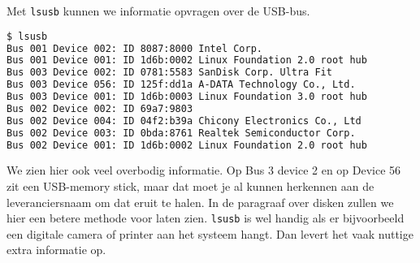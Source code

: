 Met \texttt{lsusb} kunnen we informatie opvragen over de USB-bus.

\begin{lstlisting}[language=bash]
$ lsusb
Bus 001 Device 002: ID 8087:8000 Intel Corp. 
Bus 001 Device 001: ID 1d6b:0002 Linux Foundation 2.0 root hub
Bus 003 Device 002: ID 0781:5583 SanDisk Corp. Ultra Fit
Bus 003 Device 056: ID 125f:dd1a A-DATA Technology Co., Ltd. 
Bus 003 Device 001: ID 1d6b:0003 Linux Foundation 3.0 root hub
Bus 002 Device 002: ID 69a7:9803  
Bus 002 Device 004: ID 04f2:b39a Chicony Electronics Co., Ltd 
Bus 002 Device 003: ID 0bda:8761 Realtek Semiconductor Corp. 
Bus 002 Device 001: ID 1d6b:0002 Linux Foundation 2.0 root hub
\end{lstlisting}
We zien hier ook veel overbodig informatie. Op Bus 3 device 2 en op Device 56 zit een USB-memory stick, maar dat moet je al kunnen herkennen aan de leveranciersnaam om dat eruit te halen. In de paragraaf over disken zullen we hier een betere methode voor laten zien. \texttt{lsusb} is wel handig als er bijvoorbeeld een digitale camera of printer aan het systeem hangt. Dan levert het vaak nuttige extra informatie op.
